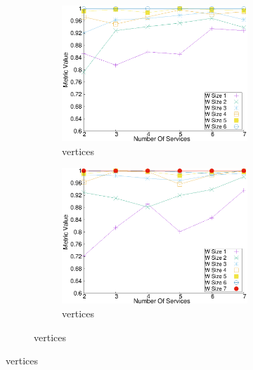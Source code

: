 \begin{figure}[H]
\begin{adjustbox}{minipage=\linewidth,scale=0.75}
\begin{subfigure}{0.45\textwidth}
    \begin{subfigure}{\textwidth}
      \includegraphics[width=\textwidth]{Images/graphs/window_quality_performance_diff_perce_n7_s7_50_89_n6}
      \caption{ vertices}
      \label{fig:quality_window_average_perce_n6}
    \end{subfigure}
  
  
    \begin{subfigure}{\textwidth}
      \includegraphics[width=\textwidth]{Images/graphs/window_quality_performance_diff_perce_n7_s7_50_89_n7}
      \caption{ vertices}
      \label{fig:quality_window_average_perce_n7}
    \end{subfigure}
  
  \end{subfigure}
  

\end{adjustbox}
\end{figure}
